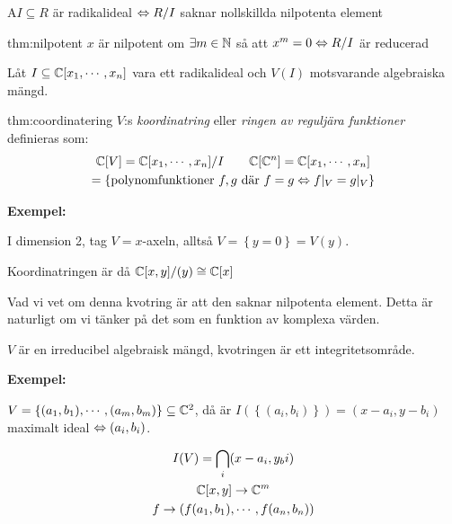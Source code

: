 \begin{theo}
  A$I\subseteq R$ är radikalideal $\Leftrightarrow R/I$ saknar nollskillda nilpotenta element
\end{theo}
\par\bigskip
\begin{theo}[Nilpotent]{thm:nilpotent}
  $x$ är nilpotent om $\exists m\in\mathbb{N}$ så att $x^m=0\Leftrightarrow R/I$ är reducerad 
\end{theo}
\par\bigskip
\noindent Låt $I\subseteq\mathbb{C}[x_1,\cdots,x_n]$ vara ett radikalideal och $V(I)$ motsvarande algebraiska mängd.
\par\bigskip
\begin{theo}[Koordinatringen]{thm:coordinatering}
  $V$:s \textit{koordinatring} eller \textit{ringen av reguljära funktioner} definieras som:
  \begin{equation*}
    \begin{gathered}
      \mathbb{C}[V] = \mathbb{C}[x_1,\cdots,x_n]/I\qquad\mathbb{C}[\mathbb{C}^n] = \mathbb{C}[x_1,\cdots,x_n]\\
      =\left\{\text{polynomfunktioner $f,g$ där $f=g\Leftrightarrow f|_V=g|_V$}\right\}
    \end{gathered}
  \end{equation*}
\end{theo}
\par\bigskip
\noindent\textbf{Exempel:}\par
\noindent I dimension 2, tag $V=x$-axeln, alltså $V = \left\{y=0\right\} = V(y)$.\par
\noindent Koordinatringen är då $\mathbb{C}[x,y]/(y) \cong\mathbb{C}[x]$\par
\noindent Vad vi vet om denna kvotring är att den saknar nilpotenta element. Detta är naturligt om vi tänker på det som en funktion av komplexa värden. \par
\noindent $V$ är en irreducibel algebraisk mängd, kvotringen är ett integritetsområde.
\par\bigskip
\noindent\textbf{Exempel:}\par
\noindent $V = \left\{(a_1,b_1),\cdots,(a_m,b_m)\right\}\subseteq\mathbb{C}^2$, då är $I(\left\{(a_i,b_i)\right\}) = (x-a_i,y-b_i)$ maximalt ideal $\Leftrightarrow (a_i,b_i)$.\par
\begin{equation*}
  \begin{gathered}
    I(V) = \bigcap_{i}(x-a_i,y_bi)\\
    \mathbb{C}[x,y]\to\mathbb{C}^m\\
    f\to (f(a_1,b_1),\cdots,f(a_n,b_n))
  \end{gathered}
\end{equation*}\par
